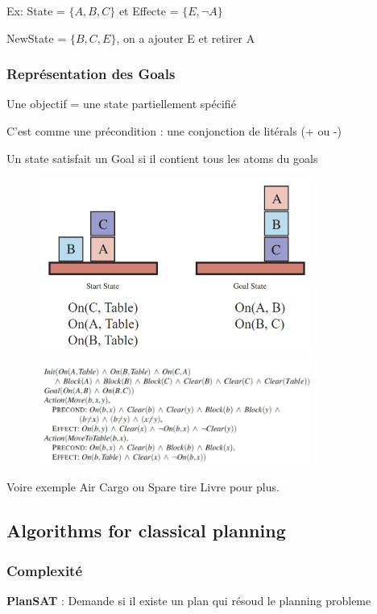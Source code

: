 			Ex:
			State = $\{A,B,C\}$ et Effecte = $\{E,\neg A\}$
			
			NewState = $\{B,C,E\}$, on a ajouter E et retirer A
			
			
			
			
			
		\subsubsection{Représentation des Goals}
			Une objectif = une state partiellement spécifié
			
			C'est comme une précondition : une conjonction de litérals (+ ou -)
			
			Un state satisfait un Goal si il contient tous les atoms du goals
		
			
			
			\begin{figure}[htp]	
				\centering
				\includegraphics[width=0.8\textwidth]{img/BLOCK.png}
				\includegraphics[width=0.8\textwidth]{img/BLOCK1.png}
			\end{figure}
			
			Voire exemple Air Cargo ou Spare tire Livre pour plus.
			 \newpage
			
	\subsection{Algorithms for classical planning}
		\subsubsection{Complexité}
			\textbf{PlanSAT} : Demande si il existe un plan qui résoud le planning probleme
			
